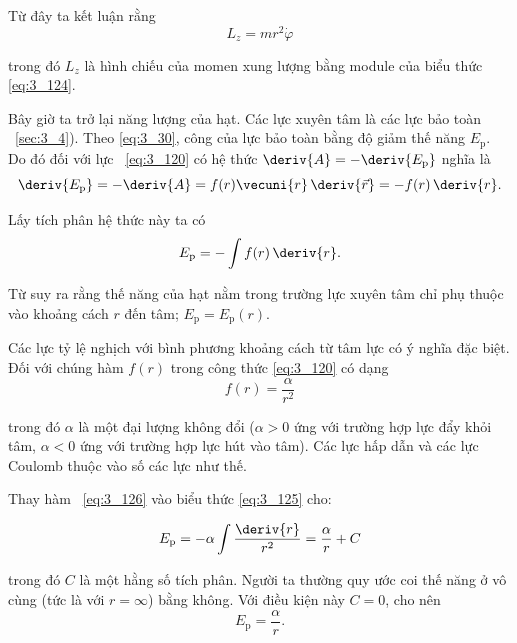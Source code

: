 \noindent
Từ đây ta kết luận rằng
\begin{equation}\label{eq:3_124}
L_z = mr^2\dot{\varphi}
\end{equation}

\noindent
trong đó $L_z$ là hình chiếu của momen xung lượng bằng module của biểu thức \eqref{eq:3_124}.

Bây giờ ta trở lại năng lượng của hạt. Các lực xuyên tâm là các lực bảo toàn ~\ref{sec:3_4}). Theo \eqref{eq:3_30}, công của lực bảo toàn bằng độ giảm thế năng $E_{\text{p}}$. Do đó đối với lực ~\eqref{eq:3_120} có hệ thức $\deriv{A}=-\deriv{E_{\text{p}}}$ nghĩa là
\begin{equation*}
\deriv{E_{\text{p}}} = -\deriv{A} = f(r)\vecuni{r}\,\deriv{\vec{r}} = -f(r)\,\deriv{r}.
\end{equation*}

\noindent
Lấy tích phân hệ thức này ta có
\begin{equation}\label{eq:3_125}
E_{\text{p}} = -\int f(r)\,\deriv{r}.
\end{equation}

\noindent
Từ  suy ra rằng thế năng của hạt nằm trong trường lực xuyên tâm chỉ phụ thuộc vào khoảng cách $r$ đến tâm; $E_{\text{p}}=E_{\text{p}}(r)$.

Các lực tỷ lệ nghịch với bình phương khoảng cách từ tâm lực có ý nghĩa đặc biệt. Đối với chúng hàm $f(r)$ trong công thức \eqref{eq:3_120} có dạng
\begin{equation}\label{eq:3_126}
f(r) = \frac{\alpha}{r^2}
\end{equation}

\noindent
trong đó $\alpha$ là một đại lượng không đổi ($\alpha>0$ ứng với trường hợp lực đẩy khỏi tâm, $\alpha<0$ ứng với trường hợp lực hút vào tâm). Các lực hấp dẫn và các lực Coulomb thuộc vào số các lực như thế.

Thay hàm ~\eqref{eq:3_126} vào biểu thức \eqref{eq:3_125} cho:

\begin{equation*}
E_{\text{p}} = -\alpha \int \frac{\deriv{r}}{r^2} = \frac{\alpha}{r} + C
\end{equation*}

\noindent
trong đó $C$ là một hằng số tích phân. Người ta thường quy ước coi thế năng ở vô cùng (tức là với $r=\infty$) bằng không. Với điều kiện này $C=0$, cho nên
\begin{equation}\label{eq:3_127}
E_{\text{p}} = \frac{\alpha}{r}.
\end{equation}

